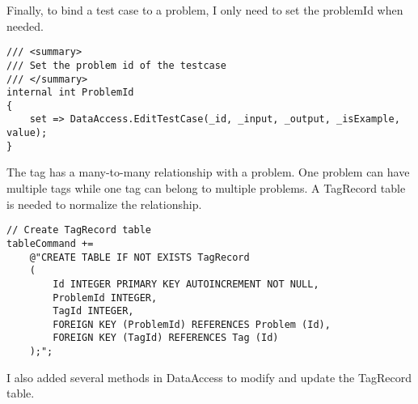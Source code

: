 \documentclass[report.tex]{subfiles}
\begin{document}
Finally, to bind a test case to a problem, I only need to set the problemId when needed.

\begin{verbatim}
/// <summary>
/// Set the problem id of the testcase
/// </summary>
internal int ProblemId 
{ 
    set => DataAccess.EditTestCase(_id, _input, _output, _isExample, value); 
}
\end{verbatim}

The tag has a many-to-many relationship with a problem. One problem can have multiple tags while one tag can belong to multiple problems. A TagRecord table is needed to normalize the relationship.

\begin{verbatim}
// Create TagRecord table
tableCommand +=
    @"CREATE TABLE IF NOT EXISTS TagRecord
    (
        Id INTEGER PRIMARY KEY AUTOINCREMENT NOT NULL,
        ProblemId INTEGER,
        TagId INTEGER,
        FOREIGN KEY (ProblemId) REFERENCES Problem (Id),
        FOREIGN KEY (TagId) REFERENCES Tag (Id)
    );";
\end{verbatim}

I also added several methods in DataAccess to modify and update the TagRecord table.
\end{document}
